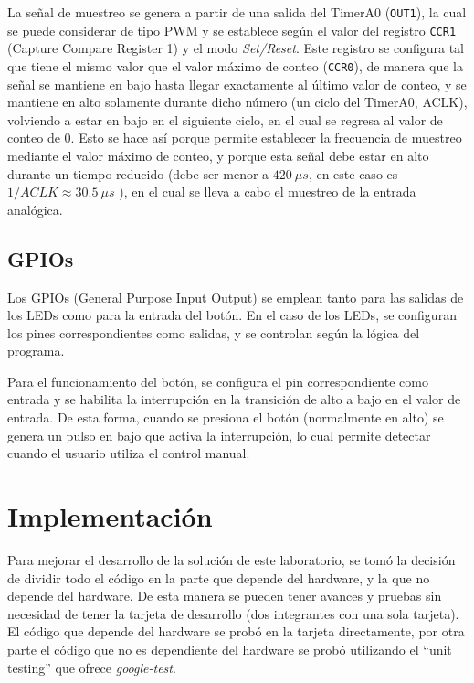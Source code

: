La señal de muestreo se genera a partir de una salida del TimerA0 (\texttt{OUT1}), la cual se puede
considerar de tipo PWM y se establece según el valor del registro \texttt{CCR1} (Capture Compare
Register 1) y el modo \textit{Set/Reset}. Este registro se configura tal que tiene el mismo valor
que el valor máximo de conteo (\texttt{CCR0}), de manera que la señal se mantiene en bajo hasta
llegar exactamente al último valor de conteo, y se mantiene en alto solamente durante dicho número
(un ciclo del TimerA0, ACLK), volviendo a estar en bajo en el siguiente ciclo, en el cual se regresa
al valor de conteo de 0. Esto se hace así porque permite establecer la frecuencia de muestreo
mediante el valor máximo de conteo, y porque esta señal debe estar en alto durante un tiempo
reducido (debe ser menor a $420~\mu s$, en este caso es $1/ACLK \approx 30.5~\mu s$ ), en el cual se
lleva a cabo el muestreo de la entrada analógica.


\subsection{GPIOs}
Los GPIOs (General Purpose Input Output) se emplean tanto para las salidas de los LEDs como para la
entrada del botón. En el caso de los LEDs, se configuran los pines correspondientes como salidas, y
se controlan según la lógica del programa. 

Para el funcionamiento del botón, se configura el pin correspondiente como entrada y se habilita la
interrupción en la transición de alto a bajo en el valor de entrada. De esta forma, cuando se
presiona el botón (normalmente en alto) se genera un pulso en bajo que activa la interrupción, lo
cual permite detectar cuando el usuario utiliza el control manual. 


\section{Implementación}

Para mejorar el desarrollo de la solución de este laboratorio, se tomó la decisión de dividir todo
el código en la parte que depende del hardware, y la que no depende del hardware. De esta manera se
pueden tener avances y pruebas sin necesidad de tener la tarjeta de desarrollo (dos integrantes con
una sola tarjeta). El código que depende del hardware se probó en la tarjeta directamente, por otra
parte el código que no es dependiente del hardware se probó utilizando el ``unit testing'' que
ofrece \textit{google-test}.

